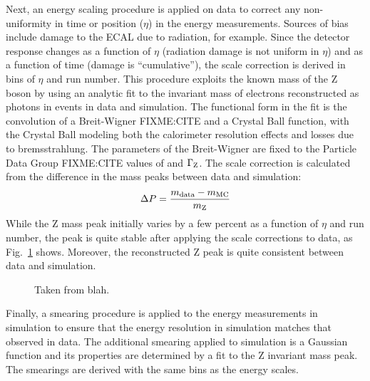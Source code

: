 Next, an energy scaling procedure is applied on data to correct any non-uniformity in time or position ($\eta$) in the energy measurements.
Sources of bias include damage to the ECAL due to radiation, for example.
Since the detector response changes as a function of $\eta$ (radiation damage is not uniform in $\eta$) and as a function of time (damage is ``cumulative''), the scale correction is derived in bins of $\eta$ and run number.
This procedure exploits the known mass of the Z boson by using an analytic fit to the invariant mass of electrons reconstructed as photons in \Zee events in data and simulation.
The functional form in the fit is the convolution of a Breit-Wigner FIXME:CITE and a Crystal Ball function, with the Crystal Ball modeling both the calorimeter resolution effects and losses due to bremsstrahlung.
The parameters of the Breit-Wigner are fixed to the Particle Data Group FIXME:CITE values of \mZ and $\Gamma_{\mathrm{Z}}$.
The scale correction is calculated from the difference in the mass peaks between data and simulation:
\begin{equation}
    \Delta P = \frac{m_{\text{data}} - m_{\text{MC}}}{m_{\mathrm{Z}}}
\end{equation}
While the Z mass peak initially varies by a few percent as a function of $\eta$ and run number, the peak is quite stable after applying the scale corrections to data, as Fig.~\ref{fig:photon_scales} shows.
Moreover, the reconstructed Z peak is quite consistent between data and simulation.
\begin{figure} [h!]
    \centering
    \caption{Taken from blah.}
    \label{fig:photon_scales}
\end{figure}

Finally, a smearing procedure is applied to the energy measurements in simulation to ensure that the energy resolution in simulation matches that observed in data.
The additional smearing applied to simulation is a Gaussian function and its properties are determined by a fit to the Z invariant mass peak.
The smearings are derived with the same bins as the energy scales.

